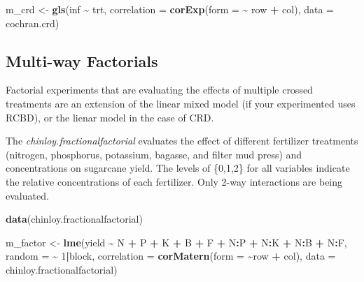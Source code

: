 \documentclass[
]{book}
\newenvironment{Shaded}{\begin{snugshade}}{\end{snugshade}}
\newcommand{\AttributeTok}[1]{\textcolor[rgb]{0.13,0.29,0.53}{#1}}
\newcommand{\DecValTok}[1]{\textcolor[rgb]{0.00,0.00,0.81}{#1}}
\newcommand{\FunctionTok}[1]{\textcolor[rgb]{0.13,0.29,0.53}{\textbf{#1}}}
\newcommand{\NormalTok}[1]{#1}
\newcommand{\OtherTok}[1]{\textcolor[rgb]{0.56,0.35,0.01}{#1}}
\newcommand{\SpecialCharTok}[1]{\textcolor[rgb]{0.81,0.36,0.00}{\textbf{#1}}}
\begin{document}
\begin{Shaded}
\begin{Highlighting}[]
\NormalTok{m\_crd }\OtherTok{\textless{}{-}} \FunctionTok{gls}\NormalTok{(inf }\SpecialCharTok{\textasciitilde{}}\NormalTok{ trt, }\AttributeTok{correlation =} \FunctionTok{corExp}\NormalTok{(}\AttributeTok{form =} \SpecialCharTok{\textasciitilde{}}\NormalTok{ row }\SpecialCharTok{+}\NormalTok{ col),}
             \AttributeTok{data =}\NormalTok{ cochran.crd)}
\end{Highlighting}
\end{Shaded}

\hypertarget{multi-way-factorials}{%
\subsection{Multi-way Factorials}\label{multi-way-factorials}}

Factorial experiments that are evaluating the effects of multiple crossed treatments are an extension of the linear mixed model (if your experimented uses RCBD), or the lienar model in the case of CRD.

The \emph{chinloy.fractionalfactorial} evaluates the effect of different fertilizer treatments (nitrogen, phosphorus, potassium, bagasse, and filter mud press) and concentrations on sugarcane yield. The levels of \{0,1,2\} for all variables indicate the relative concentrations of each fertilizer. Only 2-way interactions are being evaluated.

\begin{Shaded}
\begin{Highlighting}[]
\FunctionTok{data}\NormalTok{(chinloy.fractionalfactorial)}

\NormalTok{m\_factor }\OtherTok{\textless{}{-}} \FunctionTok{lme}\NormalTok{(yield }\SpecialCharTok{\textasciitilde{}}\NormalTok{ N }\SpecialCharTok{+}\NormalTok{ P }\SpecialCharTok{+}\NormalTok{ K }\SpecialCharTok{+}\NormalTok{ B }\SpecialCharTok{+}\NormalTok{ F }\SpecialCharTok{+}\NormalTok{ N}\SpecialCharTok{:}\NormalTok{P }\SpecialCharTok{+}\NormalTok{ N}\SpecialCharTok{:}\NormalTok{K }\SpecialCharTok{+}\NormalTok{ N}\SpecialCharTok{:}\NormalTok{B }\SpecialCharTok{+}\NormalTok{ N}\SpecialCharTok{:}\NormalTok{F, }
          \AttributeTok{random =} \SpecialCharTok{\textasciitilde{}} \DecValTok{1}\SpecialCharTok{|}\NormalTok{block, }
          \AttributeTok{correlation =} \FunctionTok{corMatern}\NormalTok{(}\AttributeTok{form =} \SpecialCharTok{\textasciitilde{}}\NormalTok{row }\SpecialCharTok{+}\NormalTok{ col), }
          \AttributeTok{data =}\NormalTok{ chinloy.fractionalfactorial)}
\end{Highlighting}
\end{Shaded}
\end{document}
